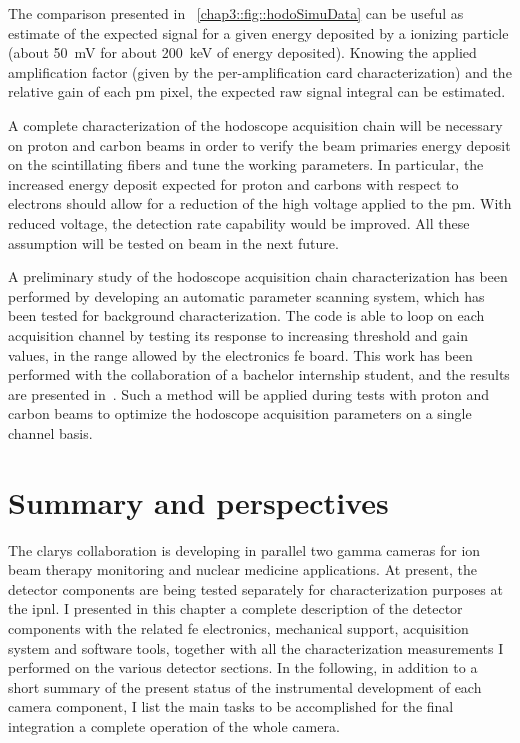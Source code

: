 The comparison presented in \figurename~\ref{chap3::fig::hodoSimuData} can be useful as estimate of the expected signal for a given energy deposited by a ionizing particle (about 50~mV for about 200~keV of energy deposited). Knowing the applied amplification factor (given by the per-amplification card characterization) and the relative gain of each \gls{pm} pixel, the expected raw signal integral can be estimated.

A complete characterization of the hodoscope acquisition chain will be necessary on proton and carbon beams in order to verify the beam primaries energy deposit on the scintillating fibers and tune the working parameters. In particular, the increased energy deposit expected for proton and carbons with respect to electrons should allow for a reduction of the high voltage applied to the \gls{pm}. With reduced voltage, the detection rate capability would be improved. All these assumption will be tested on beam in the next future.

A preliminary study of the hodoscope acquisition chain characterization has been performed by developing an automatic parameter scanning system, which has been tested for background characterization. The code is able to loop on each acquisition channel by testing its response to increasing threshold and gain values, in the range allowed by the electronics \gls{fe} board. This work has been performed with the collaboration of a bachelor internship student, and the results are presented in~\parencite{Colleaux2018}. Such a method will be applied during tests with proton and carbon beams to optimize the hodoscope acquisition parameters on a single channel basis.


\section{Summary and perspectives}\label{chap3::sec::Next}

The \gls{clarys} collaboration is developing in parallel two gamma cameras for ion beam therapy monitoring and nuclear medicine applications. At present, the detector components are being tested separately for characterization purposes at the \gls{ipnl}. I presented in this chapter a complete description of the detector components with the related \gls{fe} electronics, mechanical support, acquisition system and software tools, together with all the characterization measurements I performed on the various detector sections. In the following, in addition to a short summary of the present status of the instrumental development of each camera component, I list the main tasks to be accomplished for the final integration a complete operation of the whole camera. 

